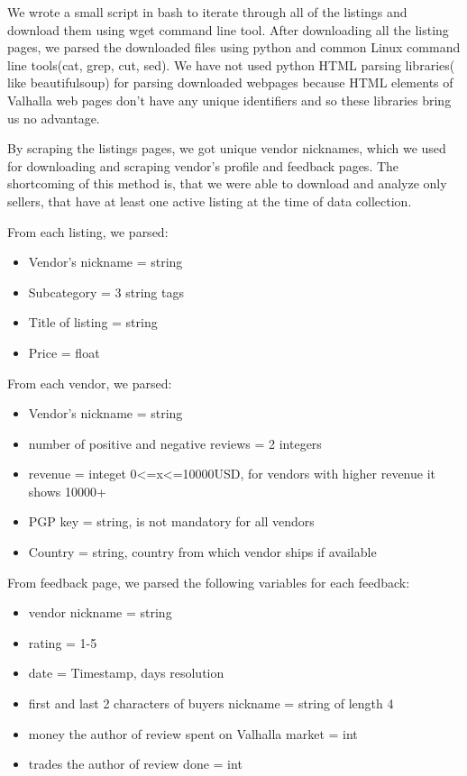 \documentclass[
  digital, %
  table,   %
  lof,     %
  lot,     %
  oneside
]{fithesis3}
\begin{document}
We wrote a small script in bash to iterate through all of the listings
and download them using wget command line tool.
After downloading all the listing pages,
we parsed the downloaded files using python and common Linux command line tools(cat, grep, cut, sed).
We have not used python HTML parsing libraries( like beautifulsoup) for parsing downloaded
webpages because HTML elements of Valhalla web pages don't have any unique identifiers
and so these libraries bring us no advantage.
 
By scraping the listings pages, we got unique vendor nicknames,
which we used for downloading and scraping vendor's profile and feedback pages. 
The shortcoming of this method is, that we were able to download and analyze only sellers, 
that have at least one active listing at the time of data collection. 

From each listing, we parsed:

\begin{itemize}
 \item Vendor's nickname = string
 \item Subcategory = 3 string tags
 \item Title of listing = string
 \item Price = float
\end{itemize}

From each vendor, we parsed:
\begin{itemize}
\item Vendor's nickname = string
\item number of positive and negative reviews = 2 integers
\item revenue = integet 0<=x<=10000USD, for vendors with higher revenue it shows 10000+
\item PGP key = string, is not mandatory for all vendors
\item Country = string, country from which vendor ships if available
\end{itemize}

From feedback page, we parsed the following variables for each feedback:
\begin{itemize}
\item vendor nickname = string
\item rating = 1-5
\item date = Timestamp, days resolution
\item first and last 2 characters of buyers nickname = string of length 4
\item money the author of review spent on Valhalla market = int
\item trades the author of review done = int
\end{itemize}
\end{document}
